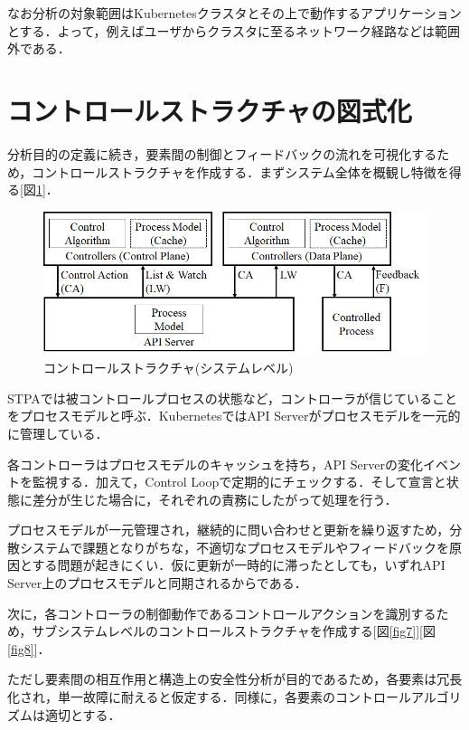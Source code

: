 \documentclass[12pt,a4j]{ujreport}
\begin{document}
なお分析の対象範囲はKubernetesクラスタとその上で動作するアプリケーションとする．よって，例えばユーザからクラスタに至るネットワーク経路などは範囲外である．

\section{コントロールストラクチャの図式化}
分析目的の定義に続き，要素間の制御とフィードバックの流れを可視化するため，コントロールストラクチャを作成する．まずシステム全体を概観し特徴を得る[図\ref{fig6}]．
\newpage
\begin{figure}[tb]
    \centerline{\includegraphics[clip,width=140mm]{images/cs-system.jpg}}
    \caption{コントロールストラクチャ(システムレベル)}\label{fig6}
\end{figure}

STPAでは被コントロールプロセスの状態など，コントローラが信じていることをプロセスモデルと呼ぶ．KubernetesではAPI Serverがプロセスモデルを一元的に管理している．

各コントローラはプロセスモデルのキャッシュを持ち，API Serverの変化イベントを監視する．加えて，Control Loopで定期的にチェックする．そして宣言と状態に差分が生じた場合に，それぞれの責務にしたがって処理を行う．

プロセスモデルが一元管理され，継続的に問い合わせと更新を繰り返すため，分散システムで課題となりがちな，不適切なプロセスモデルやフィードバックを原因とする問題が起きにくい．仮に更新が一時的に滞ったとしても，いずれAPI Server上のプロセスモデルと同期されるからである．

次に，各コントローラの制御動作であるコントロールアクションを識別するため，サブシステムレベルのコントロールストラクチャを作成する[図\ref{fig7}][図\ref{fig8}]．

ただし要素間の相互作用と構造上の安全性分析が目的であるため，各要素は冗長化され，単一故障に耐えると仮定する．同様に，各要素のコントロールアルゴリズムは適切とする．
\end{document}
